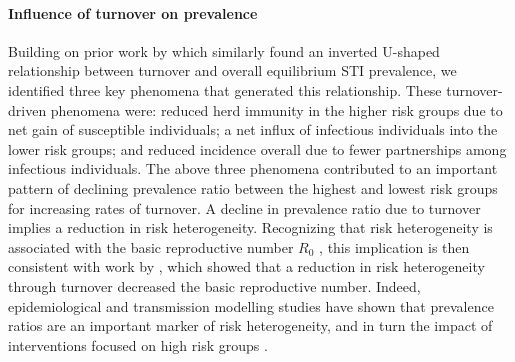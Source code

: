 \paragraph{Influence of turnover on prevalence}
Building on prior work by \citet{Stigum1994,Zhang2012,Henry2015}
which similarly found an inverted U-shaped relationship between
turnover and overall equilibrium STI prevalence,
we identified three key phenomena that generated this relationship.
These turnover-driven phenomena were:
reduced herd immunity in the higher risk groups due to net gain of susceptible individuals;
a net influx of infectious individuals into the lower risk groups; and
reduced incidence overall due to fewer partnerships among infectious individuals.
The above three phenomena contributed to an important pattern
of declining prevalence ratio between the highest and lowest risk groups
for increasing rates of turnover.
A decline in prevalence ratio due to turnover implies a reduction in risk heterogeneity.
Recognizing that risk heterogeneity is associated with
the basic reproductive number $R_0$ \citep{May1988},
this implication is then consistent with work by \citet{Henry2015},
which showed that a reduction in risk heterogeneity through turnover
decreased the basic reproductive number.
Indeed, epidemiological and transmission modelling studies have shown that prevalence ratios
are an important marker of risk heterogeneity, and in turn
the impact of interventions focused on high risk groups \citep{Baral2012,Mishra2012}.
